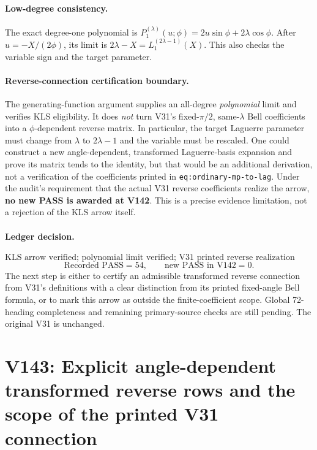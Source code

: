 \documentclass[11pt]{article}
\begin{document}
\paragraph{Low-degree consistency.}
The exact degree-one polynomial is
$P_1^{(\lambda)}(u;\phi)=2u\sin\phi+2\lambda\cos\phi$.
After $u=-X/(2\phi)$, its limit is $2\lambda-X=L_1^{(2\lambda-1)}(X)$. This also checks the variable sign and the target parameter.

\paragraph{Reverse-connection certification boundary.}
The generating-function argument supplies an all-degree \emph{polynomial} limit and verifies KLS eligibility. It does \emph{not} turn V31's fixed-$\pi/2$, same-$\lambda$ Bell coefficients into a $\phi$-dependent reverse matrix. In particular, the target Laguerre parameter must change from $\lambda$ to $2\lambda-1$ and the variable must be rescaled. One could construct a new angle-dependent, transformed Laguerre-basis expansion and prove its matrix tends to the identity, but that would be an additional derivation, not a verification of the coefficients printed in \texttt{eq:ordinary-mp-to-lag}. Under the audit's requirement that the actual V31 reverse coefficients realize the arrow, \textbf{no new PASS is awarded at V142}. This is a precise evidence limitation, not a rejection of the KLS arrow itself.

\paragraph{Ledger decision.}
\[\boxed{\text{KLS arrow verified; polynomial limit verified; V31 printed reverse realization unresolved.}}\]
\[\boxed{\text{Recorded PASS}=54,\qquad\text{new PASS in V142}=0.}\]
The next step is either to certify an admissible transformed reverse connection from V31's definitions with a clear distinction from its printed fixed-angle Bell formula, or to mark this arrow as outside the finite-coefficient scope. Global 72-heading completeness and remaining primary-source checks are still pending. The original V31 is unchanged.



\section{V143: Explicit angle-dependent transformed reverse rows and the scope of the printed V31 connection}
\label{sec:v143-mp-lag-angle}
\end{document}
